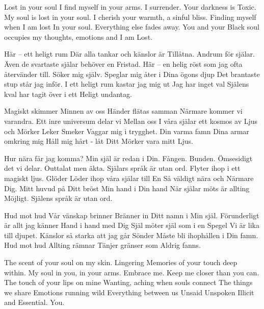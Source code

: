\startpoem
Lost in your soul
I find myself in your arms.
I surrender.
Your darkness is
Toxic.
My soul is lost in your soul.
I cherish your warmth,
a sinful bliss.
Finding myself when I am lost
In your soul.
Everything else fades away.
You and your Black soul occupies my thoughts,
emotions and I am
Lost.
\stoppoem

\startpoem
Här – ett heligt rum
Där alla tankar och känslor är 
Tillåtna.
Andrum för själar.
Även de svartaste själar behöver en 
Fristad.
Här – en helig röst 
som jag ofta återvänder till.
Söker mig själv.
Speglar mig åter i Dina ögons djup
Det brantaste stup står jag inför.
I ett heligt rum kastar jag mig ut
Jag har inget val
Själens kval har tagit över i ett
Heligt undantag.
\stoppoem

\startpoem
Magiskt skimmer
Minnen av oss
Händer flätas samman
Närmare kommer vi varandra.
Ett inre universum delar vi
Mellan oss
I våra själar ett kosmos av
Ljus och Mörker
Leker
Smeker
Vaggar mig i trygghet.
Din varma famn
Dina armar omkring mig
Håll mig hårt -  
låt Ditt Mörker vara mitt
Ljus.
\stoppoem

\startpoem
Hur nära får jag komma?
Min själ är redan i Din.
Fången. Bunden.
Ömsesidigt det vi delar.
Outtalat men äkta.
Själars språk är utan ord.
Flyter ihop i ett magiskt ljus.
Glöder
Löder ihop våra själar till
En
Så väldigt nära och 
Närmare Dig.
Mitt huvud på Ditt bröst
Min hand i Din hand
När själar möts är allting
Möjligt.
Själens språk är utan ord.
\stoppoem

\startpoem
Hud mot hud
Vår vänskap brinner
Bränner in Ditt namn i 
Min själ.
Förunderligt är allt jag känner
Hand i hand med Dig
Själ möter själ som i en 
Spegel
Vi är lika till djupet.
Känslor så starka att jag går
Sönder
Måste bli ihophållen i Din famn.
Hud mot hud
Allting rämnar
Tänjer gränser som 
Aldrig fanns.
\stoppoem

\startpoem
The scent of your soul on my skin.
Lingering
Memories of your touch deep within.
My soul in you, in your arms.
Embrace me.
Keep me closer than you can.
The touch of your lips on mine
Wanting, aching
when souls connect
The things we share
Emotions running wild
Everything between us
Unsaid
Unspoken
Illicit and
Essential.
You.
\stoppoem

